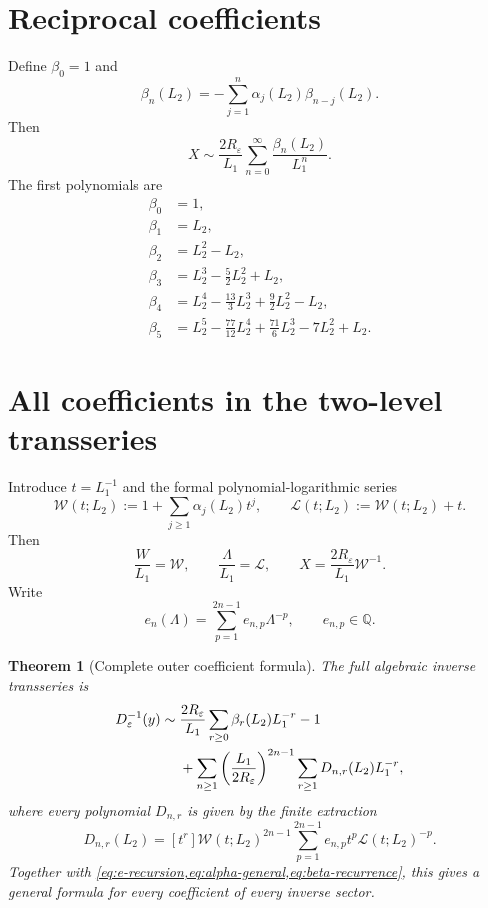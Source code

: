\documentclass[11pt,a4paper,oneside]{book}
\newtheorem{theorem}{Theorem}[chapter]
\newcommand{\Q}{\mathbb Q}
\newcommand{\coeff}[2]{\left[#1\right]#2}
\newcommand{\eps}{\varepsilon}
\begin{document}
\section{Reciprocal coefficients}

Define \(\beta_0=1\) and
\begin{equation}\label{eq:beta-recurrence}
 \beta_n(L_2)
 =-\sum_{j=1}^n
 \alpha_j(L_2)\beta_{n-j}(L_2).
\end{equation}
Then
\begin{equation}\label{eq:X-outer}
 X
 \sim\frac{2R_\eps}{L_1}
 \sum_{n=0}^\infty\frac{\beta_n(L_2)}{L_1^n}.
\end{equation}
The first polynomials are
\begin{align*}
 \beta_0&=1,\\
 \beta_1&=L_2,\\
 \beta_2&=L_2^2-L_2,\\
 \beta_3&=L_2^3-\frac52L_2^2+L_2,\\
 \beta_4&=L_2^4-\frac{13}{3}L_2^3+\frac92L_2^2-L_2,\\
 \beta_5&=L_2^5-\frac{77}{12}L_2^4
          +\frac{71}{6}L_2^3-7L_2^2+L_2.
\end{align*}

\section{All coefficients in the two-level transseries}

Introduce \(t=L_1^{-1}\) and the formal polynomial-logarithmic series
\begin{equation}\label{eq:Wcal-Lcal}
 \mathcal W(t;L_2):=
 1+\sum_{j\ge1}\alpha_j(L_2)t^j,
 \qquad
 \mathcal L(t;L_2):=\mathcal W(t;L_2)+t.
\end{equation}
Then
\[
 \frac{W}{L_1}=\mathcal W,
 \qquad
 \frac{\Lambda}{L_1}=\mathcal L,
 \qquad
 X=\frac{2R_\eps}{L_1}\mathcal W^{-1}.
\]
Write
\begin{equation}\label{eq:en-coeff-p}
 e_n(\Lambda)=
 \sum_{p=1}^{2n-1}e_{n,p}\Lambda^{-p},
 \qquad e_{n,p}\in\Q.
\end{equation}

\begin{theorem}[Complete outer coefficient formula]\label{thm:outer-complete}
The full algebraic inverse transseries is
\begin{align}
 D_\eps^{-1}(y)
 \sim{}&
 \frac{2R_\eps}{L_1}
 \sum_{r\ge0}\beta_r(L_2)L_1^{-r}-1
 \notag\\
 &+\sum_{n\ge1}
 \left(\frac{L_1}{2R_\eps}\right)^{2n-1}
 \sum_{r\ge1}
 D_{n,r}(L_2)L_1^{-r},
 \label{eq:full-outer}
\end{align}
where every polynomial \(D_{n,r}\) is given by the finite extraction
\begin{equation}\label{eq:Dnr}
 \boxed{
 D_{n,r}(L_2)
 =
 \coeff{t^r}{
  \mathcal W(t;L_2)^{2n-1}
  \sum_{p=1}^{2n-1}
  e_{n,p}t^p\mathcal L(t;L_2)^{-p}
 }.}
\end{equation}
Together with \cref{eq:e-recursion,eq:alpha-general,eq:beta-recurrence},
this gives a general formula for every coefficient of every inverse sector.
\end{theorem}
\end{document}
